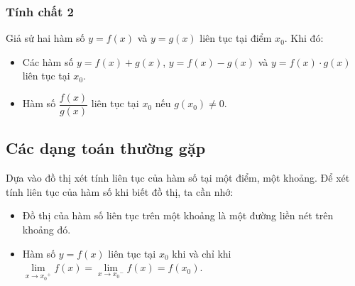 \begin{tomtat}
	\subsubsection{Tính chất 2}
	Giả sử hai hàm số $y=f(x)$ và $y=g(x)$ liên tục tại điểm $x_0$. Khi đó:
	\begin{itemize}
		\item Các hàm số $y=f(x)+g(x)$, $y=f(x)-g(x)$ và $y=f(x)\cdot g(x)$ liên tục tại $x_0$.
		\item Hàm số $\dfrac{f(x)}{g(x)}$ liên tục tại $x_0$ nếu $g(x_0)\ne 0$.
	\end{itemize}
\end{tomtat}
\subsection{Các dạng toán thường gặp}
\begin{dang}{Dựa vào đồ thị xét tính liên tục của hàm số tại một điểm, một khoảng.}
	Để xét tính liên tục của hàm số khi biết đồ thị, ta cần nhớ:
	\begin{itemize}
		\item Đồ thị của hàm số liên tục trên một khoảng là một đường liền nét trên khoảng đó.
		\item Hàm số $y=f(x)$ liên tục tại $x_0$ khi và chỉ khi $\lim\limits_{x\to{x_0}^+}f(x)=\lim\limits_{x\to{x_0}^-}f(x)=f(x_0)$.
	\end{itemize}
\end{dang}
